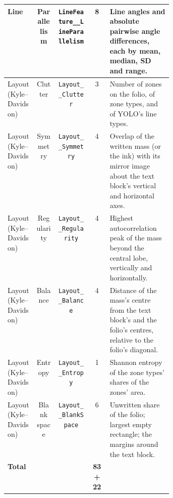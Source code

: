 \begin{table}[htbp]
\begin{tabular}{lcccp{0.38\linewidth}}
    Line & Parallelism & \texttt{LineFeature\_\_\allowbreak{}LineParallelism} & 8 & Line angles and absolute pairwise angle differences, each by mean, median, SD and range. \\
    \midrule
    Layout (Kyle--Davidson) & Clutter & \texttt{Layout\_\_\allowbreak{}Clutter} & 3 & Number of zones on the folio, of zone types, and of YOLO's line types. \\
    Layout (Kyle--Davidson) & Symmetry & \texttt{Layout\_\_\allowbreak{}Symmetry} & 4 & Overlap of the written mass (or the ink) with its mirror image about the text block's vertical and horizontal axes. \\
    Layout (Kyle--Davidson) & Regularity & \texttt{Layout\_\_\allowbreak{}Regularity} & 4 & Highest autocorrelation peak of the mass beyond the central lobe, vertically and horizontally. \\
    Layout (Kyle--Davidson) & Balance & \texttt{Layout\_\_\allowbreak{}Balance} & 4 & Distance of the mass's centre from the text block's and the folio's centres, relative to the folio's diagonal. \\
    Layout (Kyle--Davidson) & Entropy & \texttt{Layout\_\_\allowbreak{}Entropy} & 1 & Shannon entropy of the zone types' shares of the zones' area. \\
    Layout (Kyle--Davidson) & Blank space & \texttt{Layout\_\_\allowbreak{}BlankSpace} & 6 & Unwritten share of the folio; largest empty rectangle; the margins around the text block. \\
    \midrule
    \textbf{Total} &  &  & \textbf{83 + 22} &  \\
    \bottomrule
  \end{tabular}
\end{table}
